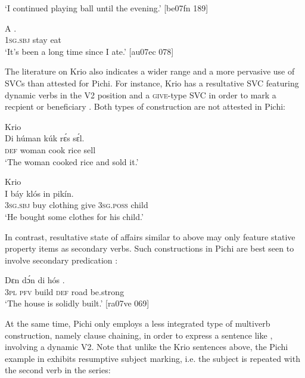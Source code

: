 \glt ‘I continued playing ball until the evening.’ [be07fn 189]
\z


\ea%
    \label{ex:1:17}
    \gll   A      .\\
\textsc{1sg.sbj}  stay    eat\\

\glt ‘It’s been a long time since I ate.’ [au07ec 078]
\z

The literature on Krio also indicates a wider range and a more pervasive use of SVCs than attested for Pichi. For instance, Krio has a resultative SVC featuring dynamic verbs in the V2 position  and a \textsc{give}{}-type SVC in order to mark a recpient or beneficiary . Both types of construction are not attested in Pichi:


\ea%
    \label{ex:1:18}
{{Krio}}{}{}\\
    \gll   Di  húman  kúk    rɛ́s    sɛ́l.                  \\
    \textsc{def}  woman  cook  rice    sell\\
\glt ‘The woman cooked rice and sold it.’ \citep[72]{Finney2004}
\z

\ea%
    \label{ex:1:19}
{{Krio}}{}{}\\
    \gll   I    báy    klós        in    pikín.\\
\textsc{3sg.sbj}  buy    clothing  give    \textsc{3sg.poss}  child\\

\glt ‘He bought some clothes for his child.’ \citep[72]{Finney2004}
\z

In contrast, resultative state of affairs similar to  above may only feature stative property items as secondary verbs. Such constructions in Pichi are best seen to involve secondary predication :


\ea%
    \label{ex:1:20}
    \gll   Dɛn    dɔ́n       di  hós    .\\
\textsc{3pl}    \textsc{pfv}    build  \textsc{def}  road    be.strong\\

\glt ‘The house is solidly built.’ [ra07ve 069]
\z

At the same time, Pichi only employs a less integrated type of multiverb construction, namely clause chaining, in order to express a sentence like , involving a dynamic V2. Note that unlike the Krio sentences above, the Pichi example in  exhibits resumptive subject marking, i.e. the subject is repeated with the second verb in the series: 


